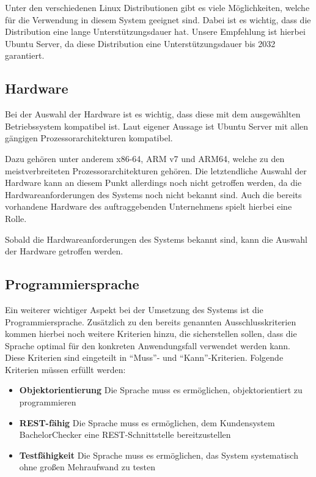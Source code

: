 Unter den verschiedenen Linux Distributionen gibt es viele Möglichkeiten, welche für die Verwendung in diesem System geeignet sind.
Dabei ist es wichtig, dass die Distribution eine lange Unterstützungsdauer hat.
Unsere Empfehlung ist hierbei Ubuntu Server, da diese Distribution eine Unterstützungsdauer bis 2032 garantiert\autocite{ubuntu}.

\subsection{Hardware}\label{subsec:hardware}
Bei der Auswahl der Hardware ist es wichtig, dass diese mit dem ausgewählten Betriebssystem kompatibel ist.
Laut eigener Aussage ist Ubuntu Server mit allen gängigen Prozessorarchitekturen kompatibel\autocite{ubuntu}.

Dazu gehören unter anderem x86-64, ARM v7 und ARM64, welche zu den meistverbreiteten Prozessorarchitekturen gehören.
Die letztendliche Auswahl der Hardware kann an diesem Punkt allerdings noch nicht getroffen werden,
da die Hardwareanforderungen des Systems noch nicht bekannt sind.
Auch die bereits vorhandene Hardware des auftraggebenden Unternehmens spielt hierbei eine Rolle.

Sobald die Hardwareanforderungen des Systems bekannt sind, kann die Auswahl der Hardware getroffen werden.

\subsection{Programmiersprache}\label{subsec:programmiersprache}
Ein weiterer wichtiger Aspekt bei der Umsetzung des Systems ist die Programmiersprache.
Zusätzlich zu den bereits genannten Ausschlusskriterien kommen hierbei noch weitere Kriterien hinzu,
die sicherstellen sollen, dass die Sprache optimal für den konkreten Anwendungsfall verwendet werden kann.
Diese Kriterien sind eingeteilt in “Muss”- und “Kann”-Kriterien.
Folgende Kriterien müssen erfüllt werden:
\begin{itemize}
    \item \textbf{Objektorientierung} Die Sprache muss es ermöglichen, objektorientiert zu programmieren
    \item \textbf{REST-fähig} Die Sprache muss es ermöglichen, dem Kundensystem BachelorChecker eine REST-Schnittstelle bereitzustellen
    \item \textbf{Testfähigkeit} Die Sprache muss es ermöglichen, das System systematisch ohne großen Mehraufwand zu testen
\end{itemize}

